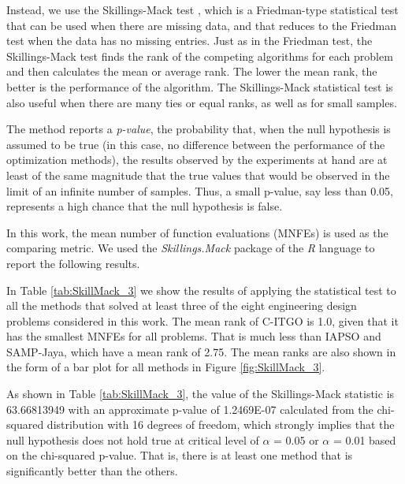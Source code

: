 Instead, we use the Skillings-Mack test \citep{Skillings}, which is a Friedman\allowbreak-type statistical test that can be used when there are missing data, and that reduces to the Friedman test when the data has no missing entries. Just as in the Friedman test, the Skillings-Mack test finds the rank of the competing algorithms for each problem and then calculates the mean or average rank. The lower the mean rank, the better is the performance of the algorithm. The Skillings-Mack statistical test is also useful when there are many ties or equal ranks, as well as for small samples.

The method reports a \textit{p-value}, the probability that, when the null hypothesis is assumed to be true (in this case, no difference between the performance of the optimization methods), the results observed by the experiments at hand are at least of the same magnitude that the true values that would be observed in the limit of an infinite number of samples. Thus, a small p-value, say less than 0.05, represents a high chance that the null hypothesis is false.

In this work, the mean number of function evaluations (MNFEs) is used as the comparing metric. We used the \textit{Skillings.Mack} package \citep{SkillMack} of the \textit{R} language \citep{R} to report the following results.

In Table \ref{tab:SkillMack_3} we show the results of applying the statistical test to all the methods that solved at least three of the eight engineering design problems considered in this work. The mean rank of C-ITGO is 1.0, given that it has the smallest MNFEs for all problems. That is much less than IAPSO and SAMP-Jaya, which have a mean rank of 2.75. The mean ranks are also shown in the form of a bar plot for all methods in Figure \ref{fig:SkillMack_3}.





As shown in Table \ref{tab:SkillMack_3}, the value of the Skillings-Mack statistic is 63.66813949 with an approximate p-value of 1.2469E-07 calculated from the chi-squared distribution with 16 degrees of freedom, which strongly implies that the null hypothesis does not hold true at critical level of $\alpha$ = 0.05 or $\alpha$ = 0.01 based on the chi-squared p-value. That is, there is at least one method that is significantly better than the others. 



